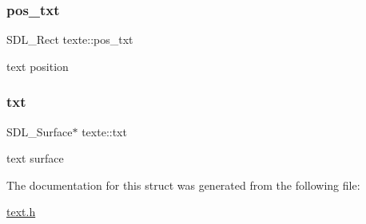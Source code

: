 \subsubsection{\texorpdfstring{pos\+\_\+txt}{pos\_txt}}
{\footnotesize\ttfamily S\+D\+L\+\_\+\+Rect texte\+::pos\+\_\+txt}

text position \mbox{\label{structtexte_a461d9c1438bee1b2f61bfb485c28e717}} 
\subsubsection{\texorpdfstring{txt}{txt}}
{\footnotesize\ttfamily S\+D\+L\+\_\+\+Surface$\ast$ texte\+::txt}

text surface 

The documentation for this struct was generated from the following file\+:\begin{DoxyCompactItemize}
\item 
\hyperlink{text_8h}{text.\+h}\end{DoxyCompactItemize}
